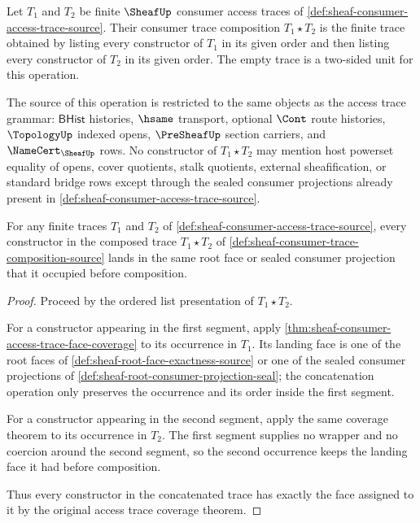 \begin{definition}
\label{def:sheaf-consumer-trace-composition-source}
Let $T_1$ and $T_2$ be finite $\SheafUp$ consumer access traces of \autoref{def:sheaf-consumer-access-trace-source}. Their consumer trace composition $T_1 \mathbin{\star} T_2$ is the finite trace obtained by listing every constructor of $T_1$ in its given order and then listing every constructor of $T_2$ in its given order. The empty trace is a two-sided unit for this operation.

The source of this operation is restricted to the same objects as the access trace grammar: $\mathsf{BHist}$ histories, $\hsame$ transport, optional $\Cont$ route histories, $\TopologyUp$ indexed opens, $\PreSheafUp$ section carriers, and $\NameCert_{\SheafUp}$ rows. No constructor of $T_1 \mathbin{\star} T_2$ may mention host powerset equality of opens, cover quotients, stalk quotients, external sheafification, or standard bridge rows except through the sealed consumer projections already present in \autoref{def:sheaf-consumer-access-trace-source}.
\end{definition}

\begin{theorem}
\label{thm:sheaf-consumer-trace-concatenation-coverage}
For any finite traces $T_1$ and $T_2$ of \autoref{def:sheaf-consumer-access-trace-source}, every constructor in the composed trace $T_1 \mathbin{\star} T_2$ of \autoref{def:sheaf-consumer-trace-composition-source} lands in the same root face or sealed consumer projection that it occupied before composition.
\end{theorem}
\begin{proof}
Proceed by the ordered list presentation of $T_1 \mathbin{\star} T_2$.

For a constructor appearing in the first segment, apply \autoref{thm:sheaf-consumer-access-trace-face-coverage} to its occurrence in $T_1$. Its landing face is one of the root faces of \autoref{def:sheaf-root-face-exactness-source} or one of the sealed consumer projections of \autoref{def:sheaf-root-consumer-projection-seal}; the concatenation operation only preserves the occurrence and its order inside the first segment.

For a constructor appearing in the second segment, apply the same coverage theorem to its occurrence in $T_2$. The first segment supplies no wrapper and no coercion around the second segment, so the second occurrence keeps the landing face it had before composition.

Thus every constructor in the concatenated trace has exactly the face assigned to it by the original access trace coverage theorem.
\end{proof}


